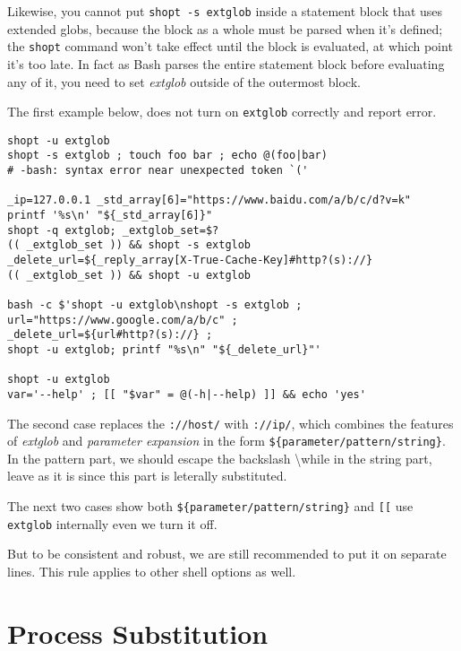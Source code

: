 Likewise, you cannot put \lstinline|shopt -s extglob| inside a
statement block that uses extended globs, because the block as a
whole must be parsed when it's defined; the \lstinline|shopt|
command won't take effect until the block is evaluated, at which
point it's too late. In fact as Bash parses the entire statement
block before evaluating any of it, you need to set
\textit{extglob} outside of the outermost block.

The first example below, does not turn on \lstinline|extglob|
correctly and report error.

\begin{minipage}{1.0\linewidth}
\begin{lstlisting}
shopt -u extglob
shopt -s extglob ; touch foo bar ; echo @(foo|bar)
# -bash: syntax error near unexpected token `('

_ip=127.0.0.1 _std_array[6]="https://www.baidu.com/a/b/c/d?v=k"
printf '%s\n' "${_std_array[6]}"
shopt -q extglob; _extglob_set=$?
(( _extglob_set )) && shopt -s extglob
_delete_url=${_reply_array[X-True-Cache-Key]#http?(s)://}
(( _extglob_set )) && shopt -u extglob

bash -c $'shopt -u extglob\nshopt -s extglob ; 
url="https://www.google.com/a/b/c" ;
_delete_url=${url#http?(s)://} ;
shopt -u extglob; printf "%s\n" "${_delete_url}"'

shopt -u extglob
var='--help' ; [[ "$var" = @(-h|--help) ]] && echo 'yes'
\end{lstlisting}  
\end{minipage}

The second case replaces the \lstinline|://host/| with
\lstinline|://ip/|, which combines the features of
\textit{extglob} and \textit{parameter expansion} in the form
\lstinline|${parameter/pattern/string}|. In the pattern part, we
should escape the backslash \textbackslash while in the string
part, leave as it is since this part is leterally substituted.

The next two cases show both
\lstinline|${parameter/pattern/string}| and \verb|[[| use
\lstinline|extglob| internally even we turn it off.

But to be consistent and robust, we are still recommended to put
it on separate lines. This rule applies to other shell options as
well.

\section{Process Substitution}
\label{sec:bash-process-substitution}

